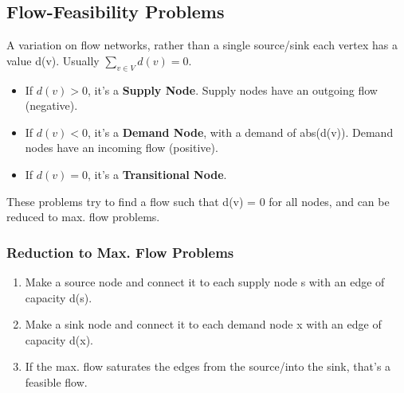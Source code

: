 \subsection{Flow-Feasibility Problems}
A variation on flow networks, rather than a single source/sink each vertex has a value d(v). Usually \(\sum_{v \in V}d(v) = 0\).
\begin{itemize}
    \item If $d(v) > 0$, it's a \textbf{Supply Node}. Supply nodes have an outgoing flow (negative).
    \item If $d(v) < 0$, it's a \textbf{Demand Node}, with a demand of abs(d(v)). Demand nodes have an incoming flow (positive).
    \item If $d(v) = 0$, it's a \textbf{Transitional Node}.
\end{itemize}
These problems try to find a flow such that d(v) = 0 for all nodes, and can be reduced to max. flow problems.

\subsubsection{Reduction to Max. Flow Problems}
\begin{enumerate}
    \item Make a source node and connect it to each supply node s with an edge of capacity d(s).
    \item Make a sink node and connect it to each demand node x with an edge of capacity d(x).
    \item If the max. flow saturates the edges from the source/into the sink, that's a feasible flow.
\end{enumerate}




